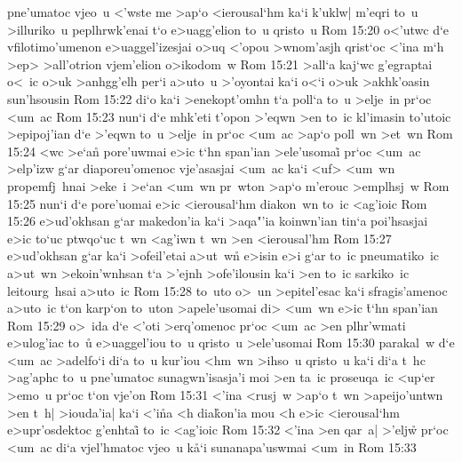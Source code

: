 pne'umatoc
vjeo~u
<'wste
me
>ap`o
<ierousal`hm
ka`i
k'uklw|
m'eqri
to~u
>illuriko~u
peplhrwk'enai
t`o
e>uagg'elion
to~u
qristo~u\bibvsend
\vs Rom 15:20
o<'utwc
d`e
vfilotimo'umenon
e>uaggel'izesjai
o>uq
<'opou
>wnom'asjh
qrist`oc
<'ina
m`h
>ep>
>all'otrion
vjem'elion
o>ikodom~w\bibvsend
\vs Rom 15:21
>all`a
kaj`wc
g'egraptai
o<~ic
o>uk
>anhgg'elh
per`i
a>uto~u
>'oyontai
ka`i
o<`i
o>uk
>akhk'oasin
sun'hsousin\bibvsend
\vs Rom 15:22
di`o
ka`i
>enekopt'omhn
t`a
poll`a
to~u
>elje~in
pr`oc
<um~ac\bibvsend
\vs Rom 15:23
nun`i
d`e
mhk'eti
t'opon
>'eqwn
>en
to~ic
kl'imasin
to'utoic
>epipoj'ian
d`e
>'eqwn
to~u
>elje~in
pr`oc
<um~ac
>ap`o
poll~wn
>et~wn\bibvsend
\vs Rom 15:24
<wc
>e`a\r{n}
pore'uwmai
e>ic
t`hn
span'ian
>ele'usomai\r{}
pr`oc
<um~ac
>elp'izw
g`ar
diaporeu'omenoc
vje'asasjai
<um~ac
ka`i
<uf>
<um~wn
propemfj~hnai
>eke~i
>e`an
<um~wn
pr~wton
>ap`o
m'erouc
>emplhsj~w\bibvsend
\vs Rom 15:25
nun`i
d`e
pore'uomai
e>ic
<ierousal`hm
diakon~wn
to~ic
<ag'ioic\bibvsend
\vs Rom 15:26
e>ud'okhsan
g`ar
makedon'ia
ka`i
>aqa"'ia
koinwn'ian
tin`a
poi'hsasjai
e>ic
to`uc
ptwqo`uc
t~wn
<ag'iwn
t~wn
>en
<ierousal'hm\bibvsend
\vs Rom 15:27
e>ud'okhsan
g`ar
ka`i
>ofeil'etai
a>ut~wn\r{}
e>isin
e>i
g`ar
to~ic
pneumatiko~ic
a>ut~wn
>ekoin'wnhsan
t`a
>'ejnh
>ofe'ilousin
ka`i
>en
to~ic
sarkiko~ic
leitourg~hsai
a>uto~ic\bibvsend
\vs Rom 15:28
to~uto
o>~un
>epitel'esac
ka`i
sfragis'amenoc
a>uto~ic
t`on
karp`on
to~uton
>apele'usomai
di>
<um~wn
e>ic
\r{t}`hn
span'ian\bibvsend
\vs Rom 15:29
o>~ida
d`e
<'oti
>erq'omenoc
pr`oc
<um~ac
>en
plhr'wmati
e>ulog'iac
to~u\r{}
e>uaggel'iou
to~u
qristo~u
>ele'usomai\bibvsend
\vs Rom 15:30
parakal~w
d`e
<um~ac
>adelfo`i
di`a
to~u
kur'iou
<hm~wn
>ihso~u
qristo~u
ka`i
di`a
t~hc
>ag'aphc
to~u
pne'umatoc
sunagwn'isasja'i
moi
>en
ta~ic
proseuqa~ic
<up`er
>emo~u
pr`oc
t`on
vje'on\bibvsend
\vs Rom 15:31
<'ina
<rusj~w
>ap`o
t~wn
>apeijo'untwn
>en
t~h|
>iouda'ia|
ka`i
<'i\r{n}a
<h
dia\r{k}on'ia
mou
<h
e>ic
<ierousal`hm
e>upr'osdektoc
g'enhtai\r{}
to~ic
<ag'ioic\bibvsend
\vs Rom 15:32
<'ina
>en
qar~a|
>'elj\r{w}
pr`oc
<um~ac
di`a
vjel'hmatoc
vjeo~u
k\r{a}`i
sunanapa'uswmai
<um~in\bibvsend
\vs Rom 15:33
